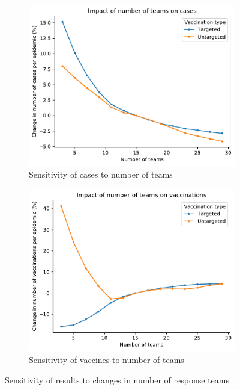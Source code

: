 \documentclass[10pt,letterpaper]{article}
\begin{document}
\begin{figure}[ht!]
  \begin{subfigure}[b]{0.5\textwidth}
    \includegraphics[width=\textwidth]{figures/sensitivity/numteams_cases.pdf}
    \caption{Sensitivity of cases to number of teams}
    \label{fig:sens_team_cases}
  \end{subfigure}
  \begin{subfigure}[b]{0.5\textwidth}
    \includegraphics[width=\textwidth]{figures/sensitivity/numteams_vaccines.pdf}
    \caption{Sensitivity of vaccines to number of teams}
    \label{fig:sens_team_vaccs}
  \end{subfigure}
  \caption{Sensitivity of results to changes in number of response teams}
\end{figure}
\end{document}
